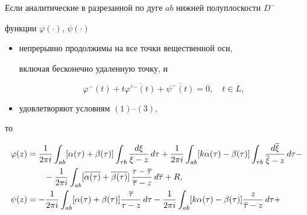\begin{lem}


Если аналитические в разрезанной по дуге $ab$ нижней полуплоскости $D^-$


функции $\varphi(\cdot)$, $\psi(\cdot)$


\begin{itemize}


\item[1)] непрерывно продолжимы на все точки вещественной оси, 


включая бесконечно удаленную точку, и


\begin{equation}


\varphi^-(t)+t\overline{\varphi'{}^-(t)}+


\overline{\psi^-(t)}=0, \quad t\in L,


\end{equation}


\item[2)] удовлетворяют условиям $(1)$--$(3)$,


\end{itemize}


то


\begin{align}


\varphi(z) &=


\frac{1}{2\pi i}\int_{ab} [\alpha(\tau)+\beta(\tau)]


\int_{\tau b}\frac{d\xi}{\xi-z}\,d\tau


+ \frac{1}{2\pi i}\int_{ab} [k\alpha(\tau)-\beta(\tau)]


\int_{\tau b}\frac{d\overline{\xi}}{\overline{\xi}-z}\,d\tau - \notag \\


%


&\qquad - \frac{1}{2\pi i}\int_{ab} [\overline{\alpha(\tau)}


+\overline{\beta(\tau)}]


\,\frac{\tau-\overline{\tau}}{\overline{\tau}-z}\,d\overline{\tau}+ R, \\


%


\psi(z) &=


- \frac{1}{2\pi i}\int_{ab} [\alpha(\tau)+\beta(\tau)]


\frac{\overline{\tau}}{\tau-z}\,d\tau


- \frac{1}{2\pi i}\int_{ab} [k\alpha(\tau)-\beta(\tau)]


\frac{z}{\overline{\tau}-z}\,d\tau + \notag \\



\end{align}
\end{lem}
